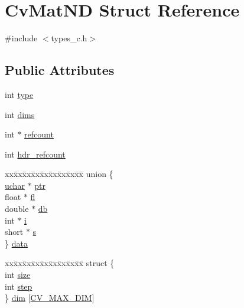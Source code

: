 \hypertarget{structCvMatND}{\section{Cv\-Mat\-N\-D Struct Reference}
\label{structCvMatND}
}


{\ttfamily \#include $<$types\-\_\-c.\-h$>$}

\subsection*{Public Attributes}
\begin{DoxyCompactItemize}
\item 
int \hyperlink{structCvMatND_ae555c16ced9ddfb8cb3fbd867cadece9}{type}
\item 
int \hyperlink{structCvMatND_afb407ea1679e188af57c7c1301de70d2}{dims}
\item 
int $\ast$ \hyperlink{structCvMatND_a7841f93b088acc0c064fa26a1b0571fc}{refcount}
\item 
int \hyperlink{structCvMatND_a72e2864dc5e48f873cd6e34b99491ceb}{hdr\-\_\-refcount}
\item 
\begin{tabbing}
xx\=xx\=xx\=xx\=xx\=xx\=xx\=xx\=xx\=\kill
union \{\\
\>\hyperlink{core_2types__c_8h_a65f85814a8290f9797005d3b28e7e5fc}{uchar} $\ast$ \hyperlink{structCvMatND_ad1e711b18cfc94d53ec060d15b6639ef}{ptr}\\
\>float $\ast$ \hyperlink{structCvMatND_a7402a379321e1bcfe94a476ed33afefd}{fl}\\
\>double $\ast$ \hyperlink{structCvMatND_a448a65a38d34e2a2781dd631ec97d416}{db}\\
\>int $\ast$ \hyperlink{structCvMatND_a080d27a015fe6e2013b06074f20bc2f5}{i}\\
\>short $\ast$ \hyperlink{structCvMatND_a52c677f77f43b7d472c92a3e99199dd3}{s}\\
\} \hyperlink{structCvMatND_aa1110d922b276d42b59e68d6dae25fd6}{data}\\

\end{tabbing}\item 
\begin{tabbing}
xx\=xx\=xx\=xx\=xx\=xx\=xx\=xx\=xx\=\kill
struct \{\\
\>int \hyperlink{structCvMatND_a26c11a958cc01cc2afce53049f4dac87}{size}\\
\>int \hyperlink{structCvMatND_ae94dea9c705fa9beab9505cdb92f38b2}{step}\\
\} \hyperlink{structCvMatND_a932f641733ae7f515415b06b6b36a7e8}{dim} \mbox{[}\hyperlink{core_2types__c_8h_a931cb1f0da753cc1f8a3f838390616c2}{CV\_MAX\_DIM}\mbox{]}\\

\end{tabbing}\end{DoxyCompactItemize}


